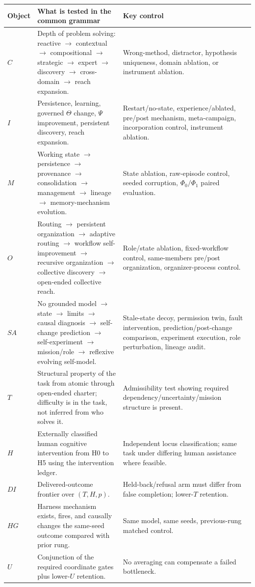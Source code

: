 \documentclass[11pt]{article}
\begin{document}
\small
\begin{tabularx}{\textwidth}{@{}>{\raggedright\arraybackslash}p{}>{\raggedright\arraybackslash}X>{\raggedright\arraybackslash}X@{}}
\toprule
Object & What is tested in the common grammar & Key control \\
\midrule
$C$ & Depth of problem solving: reactive $\to$ contextual $\to$ compositional $\to$ strategic $\to$ expert $\to$ discovery $\to$ cross-domain $\to$ reach expansion. & Wrong-method, distractor, hypothesis uniqueness, domain ablation, or instrument ablation. \\
$I$ & Persistence, learning, governed $\Theta$ change, $\Psi$ improvement, persistent discovery, reach expansion. & Restart/no-state, experience/ablated, pre/post mechanism, meta-campaign, incorporation control, instrument ablation. \\
$M$ & Working state $\to$ persistence $\to$ provenance $\to$ consolidation $\to$ management $\to$ lineage $\to$ memory-mechanism evolution. & State ablation, raw-episode control, seeded corruption, $\Phi_0/\Phi_1$ paired evaluation. \\
$O$ & Routing $\to$ persistent organization $\to$ adaptive routing $\to$ workflow self-improvement $\to$ recursive organization $\to$ collective discovery $\to$ open-ended collective reach. & Role/state ablation, fixed-workflow control, same-members pre/post organization, organizer-process control. \\
$SA$ & No grounded model $\to$ state $\to$ limits $\to$ causal diagnosis $\to$ self-change prediction $\to$ self-experiment $\to$ mission/role $\to$ reflexive evolving self-model. & Stale-state decoy, permission twin, fault intervention, prediction/post-change comparison, experiment execution, role perturbation, lineage audit. \\
$T$ & Structural property of the task from atomic through open-ended charter; difficulty is in the task, not inferred from who solves it. & Admissibility test showing required dependency/uncertainty/mission structure is present. \\
$H$ & Externally classified human cognitive intervention from H0 to H5 using the intervention ledger. & Independent locus classification; same task under differing human assistance where feasible. \\
$DI$ & Delivered-outcome frontier over $(T, H, p)$. & Held-back/refusal arm must differ from false completion; lower-$T$ retention. \\
$HG$ & Harness mechanism exists, fires, and causally changes the same-seed outcome compared with prior rung. & Same model, same seeds, previous-rung matched control. \\
$U$ & Conjunction of the required coordinate gates plus lower-$U$ retention. & No averaging can compensate a failed bottleneck. \\
\bottomrule
\end{tabularx}
\normalsize
\end{document}
